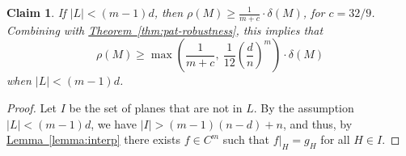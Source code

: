 \documentclass[11pt]{article}
\numberwithin{equation}{section}
\newtheorem{claim}[theorem]{Claim}
\theoremstyle{definition}
\theoremstyle{plain}
\newcommand{\expref}[2]{\hyperref[#2]{#1~\ref{#2}}}
\theoremstyle{plain}
\newcommand{\colored}{}
\newcommand{\reldist}{\colored{\delta}}
\newcommand{\robust}{\colored{\rho}} %
\newcommand{\plane}{{\colored{H}}} %
\newcommand{\codedist}{\colored{d}} %
\newcommand{\blocklength}{\colored{n}} %
\newcommand{\testerinput}{\colored{M}} %
\newcommand{\closestlocalword}[1]{ \colored{g_{#1}}} %
\newcommand{\closestglobalword}{\colored{f}} %
\newcommand\abs[1]{\colored{\left|#1\right|}}
\begin{document}
\begin{claim}
\label{claim:m}
If $\abs{L} < (m-1)\codedist$, then $\robust(\testerinput) \geq \frac{1}{m + c} \cdot \reldist(\testerinput)$, for $c = 32/9$. Combining with \expref{Theorem}{thm:pat-robustness}, this implies that
\[
  \robust(\testerinput) \geq \max \left(\frac{1}{m + c},\  \frac{1}{12} \left(\frac{\codedist}{\blocklength}\right)^m\right) \cdot \reldist(\testerinput)
\]
when $\abs{L} < (m-1)\codedist$.
\end{claim}

\begin{proof}
Let $I$ be the set of planes that are not in $L$.
By the assumption $\abs{L} < (m-1)\codedist$, we have $\abs{I} > (m-1)(\blocklength-\codedist) + \blocklength$,
and thus, by \expref{Lemma}{lemma:interp} there exists
$\closestglobalword \in C^m$ such that $\closestglobalword \vert_{\plane} = \closestlocalword{\plane}$ for all $\plane \in I$.


\end{proof}
\end{document}
